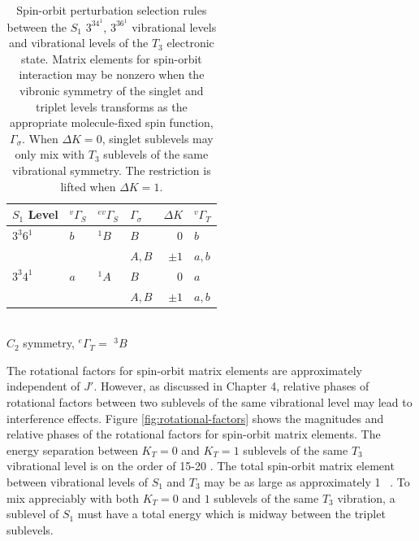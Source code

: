 \documentclass[12pt]{mitthesis}
\begin{document}
\begin{table}
  \caption{Spin-orbit perturbation selection rules between the $S_1$ $3^34^1$, 
    $3^36^1$ vibrational levels and vibrational levels of the $T_3$ 
    electronic state. Matrix elements for spin-orbit interaction may 
    be nonzero when the vibronic symmetry of the singlet and triplet 
    levels transforms as the appropriate molecule-fixed spin function,
    $\Gamma_{\sigma}$.  When $\Delta K = 0$, singlet sublevels may only 
    mix with $T_3$ sublevels of the same vibrational symmetry.  The 
    restriction is lifted when $\Delta K=1$.
  }
  \label{table:delta-k}
  \centering
  \begin{tabular}{llllrl}
    \\
    $S_1$ Level
    & $^{v}\Gamma_S$ & $^{ev}\Gamma_S$ & $\Gamma_\sigma$ & $\Delta K$ & $^{v}\Gamma_T$ \\
    \toprule
    
    $3^3 6^1$ 
    & $b$ & $^{1}B$ & $B$ & $0$ & $b$ \\
    & & & $A, B$ & $\pm1$ & $a, b$ \\
    
    $3^3 4^1$ 
    & $a$ & $^{1}A$ & $B$ & $0$ & $a$ \\
    & & & $A, B$ & $\pm1$ & $a, b$ \\[10pt]
    
  \end{tabular}\\[5mm]
  
  $C_{2}$ symmetry, $^{e}\Gamma_T =$ $^{3}B$
\end{table}

The rotational factors for spin-orbit matrix elements are
approximately independent of $J'$.  However, as discussed in Chapter
4, relative phases of rotational factors between two sublevels of the
same vibrational level may lead to interference effects.  Figure
\ref{fig:rotational-factors} shows the magnitudes and relative phases of
the rotational factors for spin-orbit matrix elements.  The energy
separation between $K_T=0$ and $K_T=1$ sublevels of the same $T_3$
vibrational level is on the order of 15-20 \rcm \cite{thom07}.  The total
spin-orbit matrix element between vibrational levels of $S_1$ and
$T_3$ may be as large as approximately 1 \rcm\ \cite{thom07}.  To mix
appreciably with both $K_T=0$ and $1$ sublevels of the same $T_3$
vibration, a sublevel of $S_1$ must have a total energy which is
midway between the triplet sublevels.

\end{document}
